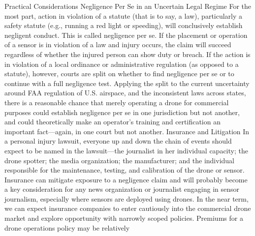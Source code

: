 \begin{itemize}
Practical Considerations
Negligence Per Se in an Uncertain Legal Regime
For the most part, action in violation of a statute (that is to say, a law), particularly
a safety statute (e.g., running a red light or speeding), will conclusively
establish negligent conduct. This is called negligence per se. If the
placement or operation of a sensor is in violation of a law and injury occurs,
the claim will succeed regardless of whether the injured person can show
duty or breach. If the action is in violation of a local ordinance or administrative
regulation (as opposed to a statute), however, courts are split on
whether to find negligence per se or to continue with a full negligence test.
Applying the split to the current uncertainty around FAA regulation of U.S.
airspace, and the inconsistent laws across states, there is a reasonable chance
that merely operating a drone for commercial purposes could establish negligence
per se in one jurisdiction but not another, and could theoretically
make an operator's training and certification an important fact—again, in
one court but not another.
Insurance and Litigation
In a personal injury lawsuit, everyone up and down the chain of events
should expect to be named in the lawsuit—the journalist in her individual
capacity; the drone spotter; the media organization; the manufacturer; and
the individual responsible for the maintenance, testing, and calibration of
the drone or sensor.
Insurance can mitigate exposure to a negligence claim and will probably
become a key consideration for any news organization or journalist engaging
in sensor journalism, especially where sensors are deployed using drones.
In the near term, we can expect insurance companies to enter cautiously
into the commercial drone market and explore opportunity with narrowly
scoped policies. Premiums for a drone operations policy may be relatively


\end{itemize}
